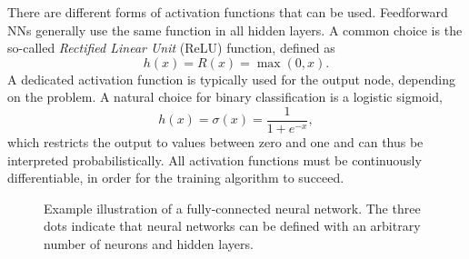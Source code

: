 There are different forms of activation functions that can be used.
Feedforward NNs generally use the same function in all hidden layers.
A common choice is the so-called \emph{Rectified Linear Unit} (ReLU) function, defined as
\begin{equation}
    {h(x)= R(x) = \max(0,x)}.    
\end{equation}
A dedicated activation function is typically used for the output node, depending on the problem.
A natural choice for binary classification is a logistic sigmoid,
\begin{equation}
    \label{eq:logistic-sigmoid}
    h(x)= \sigma(x) = {\frac {1}{1+e^{-x}}},
\end{equation}
which restricts the output to values between zero and one and can thus be interpreted probabilistically.
All activation functions must be continuously differentiable, in order for the training algorithm to succeed.






\begin{figure}[t]
    \caption{Example illustration of a fully-connected neural network. The three dots indicate that neural networks can be defined with an arbitrary number of neurons and hidden layers.}
    \label{fig:neural-net}
\end{figure}




